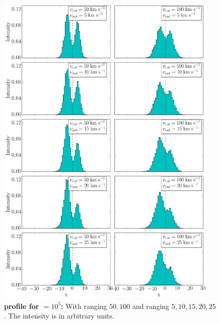 \begin{figure}[h!]
	\begin{center}
		\includegraphics[width=0.95\textwidth]{./figures/chapter3/3_tau10E5_phi83-90}
	\end{center}
	\caption{\textbf{\lya profile for \tauh$=10^5$:} With \vrot ranging $50,100$ \kms and \vout ranging $5,10,15,20,25$ \kms. The intensity is in arbitrary units.
		\label{fig:3_tau10E5_phi83-90}}
\end{figure}

\newpage

